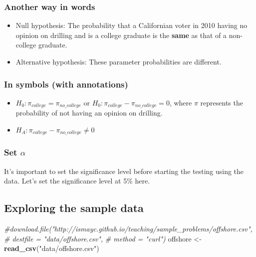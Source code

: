 \documentclass[]{tufte-book}
\newenvironment{Shaded}{\begin{snugshade}}{\end{snugshade}}
\newcommand{\KeywordTok}[1]{\textcolor[rgb]{0.13,0.29,0.53}{\textbf{{#1}}}}
\newcommand{\StringTok}[1]{\textcolor[rgb]{0.31,0.60,0.02}{{#1}}}
\newcommand{\CommentTok}[1]{\textcolor[rgb]{0.56,0.35,0.01}{\textit{{#1}}}}
\newcommand{\NormalTok}[1]{{#1}}
\providecommand{\tightlist}{%
  \setlength{\itemsep}{0pt}\setlength{\parskip}{0pt}}
\begin{document}
\subsubsection{Another way in words}\label{another-way-in-words}

\begin{itemize}
\item
  Null hypothesis: The probability that a Californian voter in 2010
  having no opinion on drilling and is a college graduate is the
  \textbf{same} as that of a non-college graduate.
\item
  Alternative hypothesis: These parameter probabilities are different.
\end{itemize}

\subsubsection{In symbols (with
annotations)}\label{in-symbols-with-annotations-2}

\begin{itemize}
\tightlist
\item
  \(H_0: \pi_{college} = \pi_{no\_college}\) or
  \(H_0: \pi_{college} - \pi_{no\_college} = 0\), where \(\pi\)
  represents the probability of not having an opinion on drilling.
\item
  \(H_A: \pi_{college} - \pi_{no\_college} \ne 0\)
\end{itemize}

\subsubsection{\texorpdfstring{Set
\(\alpha\)}{Set \textbackslash{}alpha}}\label{set-alpha-2}

It's important to set the significance level before starting the testing
using the data. Let's set the significance level at 5\% here.

\subsection{Exploring the sample
data}\label{exploring-the-sample-data-2}

\begin{Shaded}
\begin{Highlighting}[]
\CommentTok{#download.file("http://ismayc.github.io/teaching/sample_problems/offshore.csv",}
\CommentTok{#              destfile = "data/offshore.csv", }
\CommentTok{#              method = "curl")}
\NormalTok{offshore <-}\StringTok{ }\KeywordTok{read_csv}\NormalTok{(}\StringTok{"data/offshore.csv"}\NormalTok{)}
\end{Highlighting}
\end{Shaded}
\end{document}
